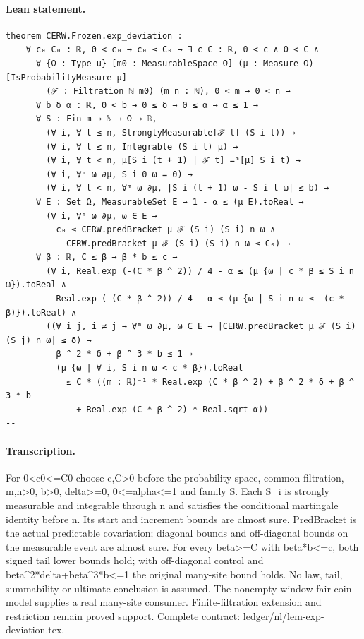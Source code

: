 \paragraph{Lean statement.}
\begin{verbatim}
theorem CERW.Frozen.exp_deviation :
    ∀ c₀ C₀ : ℝ, 0 < c₀ → c₀ ≤ C₀ → ∃ c C : ℝ, 0 < c ∧ 0 < C ∧
      ∀ {Ω : Type u} [m0 : MeasurableSpace Ω] (μ : Measure Ω) [IsProbabilityMeasure μ]
        (ℱ : Filtration ℕ m0) (m n : ℕ), 0 < m → 0 < n →
      ∀ b δ α : ℝ, 0 < b → 0 ≤ δ → 0 ≤ α → α ≤ 1 →
      ∀ S : Fin m → ℕ → Ω → ℝ,
        (∀ i, ∀ t ≤ n, StronglyMeasurable[ℱ t] (S i t)) →
        (∀ i, ∀ t ≤ n, Integrable (S i t) μ) →
        (∀ i, ∀ t < n, μ[S i (t + 1) | ℱ t] =ᵐ[μ] S i t) →
        (∀ i, ∀ᵐ ω ∂μ, S i 0 ω = 0) →
        (∀ i, ∀ t < n, ∀ᵐ ω ∂μ, |S i (t + 1) ω - S i t ω| ≤ b) →
      ∀ E : Set Ω, MeasurableSet E → 1 - α ≤ (μ E).toReal →
        (∀ i, ∀ᵐ ω ∂μ, ω ∈ E →
          c₀ ≤ CERW.predBracket μ ℱ (S i) (S i) n ω ∧
            CERW.predBracket μ ℱ (S i) (S i) n ω ≤ C₀) →
      ∀ β : ℝ, C ≤ β → β * b ≤ c →
        (∀ i, Real.exp (-(C * β ^ 2)) / 4 - α ≤ (μ {ω | c * β ≤ S i n ω}).toReal ∧
          Real.exp (-(C * β ^ 2)) / 4 - α ≤ (μ {ω | S i n ω ≤ -(c * β)}).toReal) ∧
        ((∀ i j, i ≠ j → ∀ᵐ ω ∂μ, ω ∈ E → |CERW.predBracket μ ℱ (S i) (S j) n ω| ≤ δ) →
          β ^ 2 * δ + β ^ 3 * b ≤ 1 →
          (μ {ω | ∀ i, S i n ω < c * β}).toReal
            ≤ C * ((m : ℝ)⁻¹ * Real.exp (C * β ^ 2) + β ^ 2 * δ + β ^ 3 * b
              + Real.exp (C * β ^ 2) * Real.sqrt α))
--
\end{verbatim}
\paragraph{Transcription.}
For 0<c0<=C0 choose c,C>0 before the probability space, common filtration, m,n>0, b>0, delta>=0, 0<=alpha<=1 and family S. Each S_i is strongly measurable and integrable through n and satisfies the conditional martingale identity before n. Its start and increment bounds are almost sure. PredBracket is the actual predictable covariation; diagonal bounds and off-diagonal bounds on the measurable event are almost sure. For every beta>=C with beta*b<=c, both signed tail lower bounds hold; with off-diagonal control and beta^2*delta+beta^3*b<=1 the original many-site bound holds. No law, tail, summability or ultimate conclusion is assumed. The nonempty-window fair-coin model supplies a real many-site consumer. Finite-filtration extension and restriction remain proved support. Complete contract: ledger/nl/lem-exp-deviation.tex.
